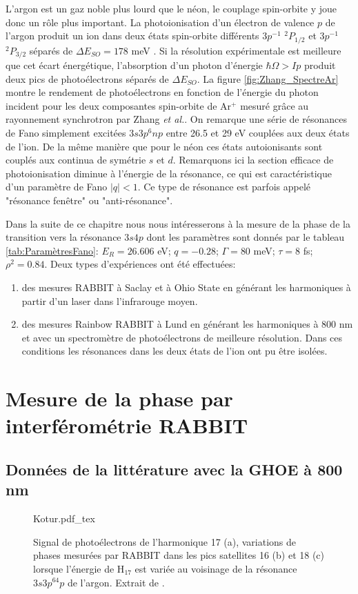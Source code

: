 L'argon est un gaz noble plus lourd que le néon, le couplage spin-orbite y joue donc un rôle plus important. La photoionisation d'un électron de valence $p$ de l'argon produit un ion dans deux états spin-orbite différents $3p^{-1}$ $^{2}P_{1/2}$ et $3p^{-1}$ $^{2}P_{3/2}$ séparés de $\Delta E_{SO} = 178$ meV . Si la résolution expérimentale est meilleure que cet écart énergétique, l'absorption d'un photon d'énergie $\hbar \Omega > Ip$ produit deux pics de photoélectrons séparés de $\Delta E_{SO}$. La figure \ref{fig:Zhang_SpectreAr} montre le rendement de photoélectrons en fonction de l'énergie du photon incident pour les deux composantes spin-orbite de Ar$^+$ mesuré grâce au rayonnement synchrotron par Zhang \textit{et al.}. On remarque une série de résonances de Fano simplement excitées $3s3p^{6}np$ entre 26.5 et 29 eV couplées aux deux états de l'ion. De la même manière que pour le néon ces états autoionisants sont couplés aux continua de symétrie $s$ et $d$. Remarquons ici la section efficace de photoionisation diminue à l'énergie de la résonance, ce qui est caractéristique d'un paramètre de Fano $|q| < 1$. Ce type de résonance est parfois appelé "résonance fenêtre" ou "anti-résonance".

Dans la suite de ce chapitre nous nous intéresserons à la mesure de la phase de la transition vers la résonance $3s4p$ dont les paramètres sont donnés par le tableau \ref{tab:ParamètresFano}: $E_R = 26.606$ eV; $q = -0.28$; $\Gamma =  80$ meV; $\tau = 8$ fs; $\rho^2 = 0.84$. Deux types d'expériences ont été effectuées:
\begin{enumerate}
\item des mesures RABBIT à Saclay et à Ohio State en générant les harmoniques à partir d'un laser dans l'infrarouge moyen.
\item des mesures Rainbow RABBIT à Lund en générant les harmoniques à 800 nm et avec un spectromètre de photoélectrons de meilleure résolution. Dans ces conditions les résonances dans les deux états de l'ion ont pu être isolées.
\end{enumerate}

\section{Mesure de la phase par interférométrie RABBIT}
\subsection{Données de la littérature avec la GHOE à 800 nm}
\begin{figure}[ht]
\centering
\def\svgwidth{0.5\textwidth}
{Kotur.pdf_tex}
\caption{Signal de photoélectrons de l'harmonique 17 (a), variations de phases mesurées par RABBIT dans les pics satellites 16 (b) et 18 (c) lorsque l'énergie de H$_{17}$ est variée au voisinage de la résonance $3s3p^64p$ de l'argon. Extrait de .}
\label{fig:Kotur}
\end{figure}

